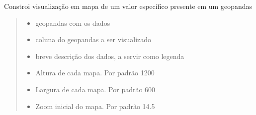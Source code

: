 \documentclass[letterpaper,10pt,brazil]{sphinxmanual}
\begin{document}
\begin{fulllineitems}
\begin{fulllineitems}
\label{\detokenize{api_gen/apiModulo.api_visualizacao:apiModulo.api_visualizacao.ApiVis.visMapaGJson}}
\pysigstartsignatures
{}
\pysigstopsignatures
\sphinxAtStartPar
Constroi visualização em mapa de um valor específico presente em um geopandas
\begin{quote}\begin{description}
\begin{itemize}
\item {} 
\sphinxAtStartPar
{} \textendash{} geopandas com os dados

\item {} 
\sphinxAtStartPar
{} \textendash{} coluna do geopandas a ser visualizado

\item {} 
\sphinxAtStartPar
{} \textendash{} breve descrição dos dados, a servir como legenda

\item {} 
\sphinxAtStartPar
{} \textendash{} Altura de cada mapa. Por padrão 1200

\item {} 
\sphinxAtStartPar
{} \textendash{} Largura de cada mapa. Por padrão 600

\item {} 
\sphinxAtStartPar
{} \textendash{} Zoom inicial do mapa. Por padrão 14.5

\end{itemize}

\end{description}\end{quote}

\end{fulllineitems}



\end{fulllineitems}
\end{document}
